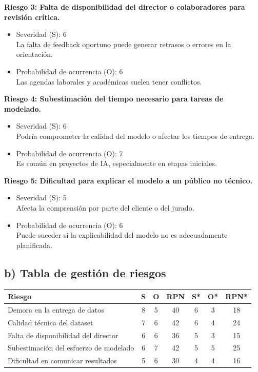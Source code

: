 \documentclass[
11pt, %
]{charter}
\begin{document}
\textbf{Riesgo 3: Falta de disponibilidad del director o colaboradores para revisión crítica.}
\begin{itemize}
  \item Severidad (S): 6 \\
  La falta de feedback oportuno puede generar retrasos o errores en la orientación.
  \item Probabilidad de ocurrencia (O): 6 \\
  Las agendas laborales y académicas suelen tener conflictos.
\end{itemize}

\textbf{Riesgo 4: Subestimación del tiempo necesario para tareas de modelado.}
\begin{itemize}
  \item Severidad (S): 6 \\
  Podría comprometer la calidad del modelo o afectar los tiempos de entrega.
  \item Probabilidad de ocurrencia (O): 7 \\
  Es común en proyectos de IA, especialmente en etapas iniciales.
\end{itemize}

\textbf{Riesgo 5: Dificultad para explicar el modelo a un público no técnico.}
\begin{itemize}
  \item Severidad (S): 5 \\
  Afecta la comprensión por parte del cliente o del jurado.
  \item Probabilidad de ocurrencia (O): 6 \\
  Puede suceder si la explicabilidad del modelo no es adecuadamente planificada.
\end{itemize}

\subsection*{b) Tabla de gestión de riesgos}

\begin{table}[htpb]
\centering
\begin{tabularx}{\linewidth}{@{}|X|c|c|c|c|c|c|@{}}
\hline
\rowcolor[HTML]{C0C0C0} 
Riesgo & S & O & RPN & S* & O* & RPN* \\ \hline
Demora en la entrega de datos & 8 & 5 & 40 & 6 & 3 & 18 \\ \hline
Calidad técnica del dataset & 7 & 6 & 42 & 6 & 4 & 24 \\ \hline
Falta de disponibilidad del director & 6 & 6 & 36 & 5 & 3 & 15 \\ \hline
Subestimación del esfuerzo de modelado & 6 & 7 & 42 & 5 & 5 & 25 \\ \hline
Dificultad en comunicar resultados & 5 & 6 & 30 & 4 & 4 & 16 \\ \hline
\end{tabularx}
\end{table}
\end{document}
